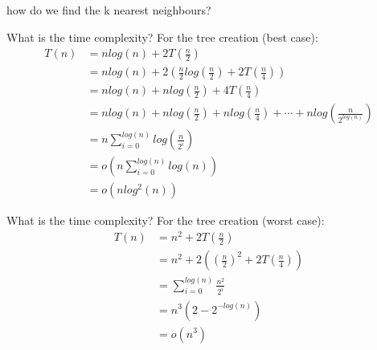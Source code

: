 \documentclass[11 pt]{beamer}
\begin{document}
\begin{frame}{how do we find the k nearest neighbours?}

\end{frame}

\begin{frame}{What is the time complexity?}
  For the tree creation (best case):
  \begin{align*}
    T(n) &= nlog(n)+2T\left(\frac{n}{2}\right)\\
         &= nlog(n)+2\left(\frac{n}{2}log\left(\frac{n}{2}\right)+2T\left(\frac{n}{4}\right)\right)\\
         &= nlog(n)+nlog\left(\frac{n}{2}\right)+4T\left(\frac{n}{4}\right)\\
         &= nlog(n)+nlog\left(\frac{n}{2}\right)+nlog\left(\frac{n}{4}\right)+\cdots+nlog\left(\frac{n}{2^{log(n)}}\right)\\
         &= n\sum^{log(n)}_{i=0}log\left(\frac{n}{2^i}\right)\\
         &= o\left(n\sum^{log(n)}_{i=0}log(n)\right)\\
         &= o(nlog^2(n))
  \end{align*}
\end{frame}

\begin{frame}{What is the time complexity?}
  For the tree creation (worst case):
  \begin{align*}
    T(n) &= n^2 +2T\left(\frac{n}{2}\right)\\
         &= n^2 +2\left(\left(\frac{n}{2}\right)^2+2T\left(\frac{n}{4}\right)\right)\\
         &= \sum^{log(n)}_{i=0}\frac{n^2}{2^i}\\
         &= n^3(2-2^{-log(n)})\\
         &= o(n^3)
  \end{align*}
\end{frame}
\end{document}
